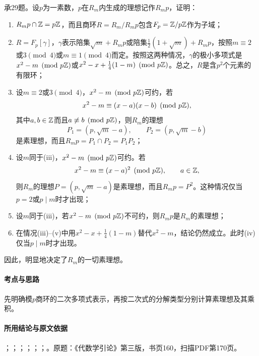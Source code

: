 承29题。设$p$为一素数，$p$在$R_m$内生成的理想记作$R_mp$，证明：
\begin{enumerate}[label=(\roman*)]
\item $R_mp\cap\mathbb Z=p\mathbb Z$，而且商环$R=R_m/R_mp$包含$F_p=\mathbb Z/p\mathbb Z$作为子域；
\item $R=F_p[\gamma]$，$\gamma$表示陪集$\sqrt m+R_mp$或陪集$\tfrac12(1+\sqrt m)+R_mp$，按照$m\equiv2$或$3\pmod4$或$m\equiv1\pmod4$而定。按照这两种情况，$\gamma$的极小多项式是$x^2-m\pmod{p\mathbb Z}$或$x^2-x+\tfrac14(1-m)\pmod{p\mathbb Z}$。总之，$R$是含$p^2$个元素的有限环；
\item 设$m\equiv2$或$3\pmod4$，$x^2-m\pmod{p\mathbb Z}$可约，若
\[
x^2-m\equiv(x-a)(x-b)\pmod{p\mathbb Z},
\]
其中$a,b\in\mathbb Z$而且$a\not\equiv b\pmod{p\mathbb Z}$，则$R_m$的理想
\[
P_1=(p,\sqrt m-a),\qquad P_2=(p,\sqrt m-b)
\]
是素理想，而且$R_mp=P_1\cap P_2=P_1P_2$；
\item 设$m$同于(iii)，$x^2-m\pmod{p\mathbb Z}$可约。若
\[
x^2-m\equiv(x-a)^2\pmod{p\mathbb Z},\qquad a\in\mathbb Z,
\]
则$R_m$的理想$P=(p,\sqrt m-a)$是素理想，而且$R_mp=P^2$。这种情况仅当$p=2$或$p\mid m$时才出现；
\item 设$m$同于(iii)，若$x^2-m\pmod{p\mathbb Z}$不可约，则$R_mp$是$R_m$的素理想；
\item 在情况(iii)--(v)中用$x^2-x+\tfrac14(1-m)$替代$x^2-m$，结论仍然成立。此时(iv)仅当$p\mid m$时才出现。
\end{enumerate}
因此，明显地决定了$R_m$的一切素理想。

\paragraph{考点与思路}

先明确模$p$商环的二次多项式表示，再按二次式的分解类型分别计算素理想及其乘积。

\paragraph{所用结论与原文依据}

；；；；；；。原题：《代数学引论》第三版，书页160，扫描PDF第170页。


